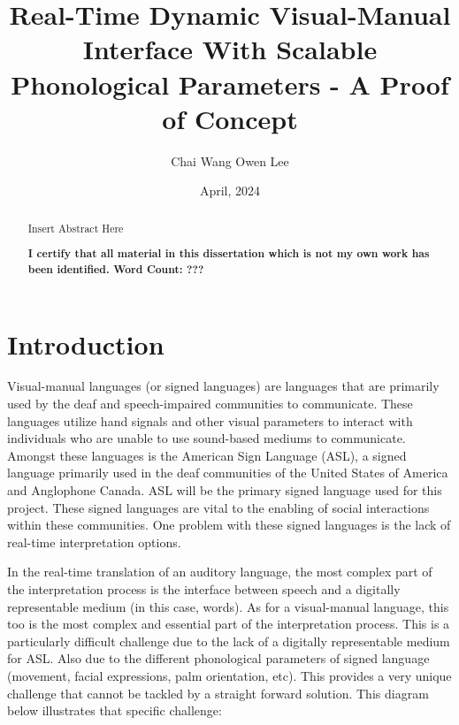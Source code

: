 \documentclass[11pt]{article}
\def\paraskip{\vskip 0.4cm}
\begin{document}
\title{Real-Time Dynamic Visual-Manual Interface With Scalable Phonological Parameters - A Proof of Concept}
\author{Chai Wang Owen Lee}

\date{April, 2024}
\maketitle

\begin{abstract}
    Insert Abstract Here
    \vspace*{\fill}

    \noindent 
    \textbf{I certify that all material in this dissertation which is not my own work has been identified. Word Count: ???}
\end{abstract}

\pagebreak
{}
\begingroup
  \flushbottom
  \setlength{\parskip}{0pt plus 1fil}%
  \tableofcontents
  \newpage
\endgroup

\pagebreak
\section{Introduction}
    Visual-manual languages (or signed languages) are languages that are primarily used by the deaf and speech-impaired communities to communicate. These languages utilize hand signals and other visual parameters to interact with individuals who are unable to use sound-based mediums to communicate. Amongst these languages is the American Sign Language (ASL), a signed language primarily used in the deaf communities of the United States of America and Anglophone Canada. ASL will be the primary signed language used for this project. These signed languages are vital to the enabling of social interactions within these communities. One problem with these signed languages is the lack of real-time interpretation options.

    \paraskip
    In the real-time translation of an auditory language, the most complex part of the interpretation process is the interface between speech and a digitally representable medium (in this case, words). As for a visual-manual language, this too is the most complex and essential part of the interpretation process. This is a particularly difficult challenge due to the lack of a digitally representable medium for ASL. Also due to the different phonological parameters of signed language (movement, facial expressions, palm orientation, etc). This provides a very unique challenge that cannot be tackled by a straight forward solution. This diagram below illustrates that specific challenge:
\end{document}
